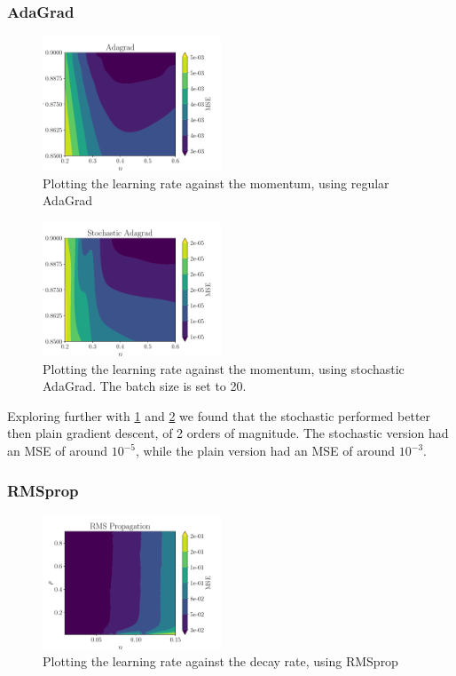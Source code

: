 \subsubsection{AdaGrad}
\begin{figure}[ht!]
    \centering
    \includegraphics[width = 0.475\textwidth]{../figs/AdagradMomentum_eta_gamma.pdf}
    \caption{Plotting the learning rate against the momentum, using regular AdaGrad}
    \label{fig: AdagradMomentum_eta_gamma}
\end{figure}
\begin{figure}[ht!]
    \centering
    \includegraphics[width = 0.475\textwidth]{../figs/AdagradMomentum_stochastic_eta_gamma.pdf}
    \caption{Plotting the learning rate against the momentum, using stochastic AdaGrad. The batch size is set to 20.}
    \label{fig: AdagradMomentum_stochastic_eta_gamma}
\end{figure}
Exploring further with \cref{fig: AdagradMomentum_eta_gamma} and \cref{fig: AdagradMomentum_stochastic_eta_gamma} we found that the stochastic performed better then plain gradient descent, of 2 orders of magnitude. The stochastic version had an MSE of around \(10^{-5}\), while the plain version had an MSE of around \(10^{-3}\).

\subsubsection{RMSprop}
\begin{figure}[ht!]
    \centering
    \includegraphics[width = 0.475\textwidth]{../figs/RMS_Prop_eta_rho.pdf}
    \caption{Plotting the learning rate against the decay rate, using RMSprop}
    \label{fig: RMS_Prop_eta_rho}
\end{figure}

